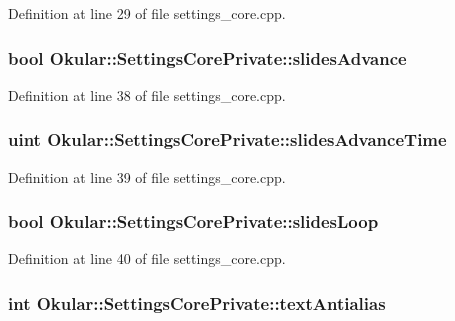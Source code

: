Definition at line 29 of file settings\+\_\+core.\+cpp.

\hypertarget{classOkular_1_1SettingsCorePrivate_a2f5216596525d18888fe9ca9f50a149e}{
\subsubsection[{slides\+Advance}]{\setlength{\rightskip}{0pt plus 5cm}bool Okular\+::\+Settings\+Core\+Private\+::slides\+Advance}}\label{classOkular_1_1SettingsCorePrivate_a2f5216596525d18888fe9ca9f50a149e}


Definition at line 38 of file settings\+\_\+core.\+cpp.

\hypertarget{classOkular_1_1SettingsCorePrivate_ab02e22e0548486391fa4394ba41e0a3e}{
\subsubsection[{slides\+Advance\+Time}]{\setlength{\rightskip}{0pt plus 5cm}uint Okular\+::\+Settings\+Core\+Private\+::slides\+Advance\+Time}}\label{classOkular_1_1SettingsCorePrivate_ab02e22e0548486391fa4394ba41e0a3e}


Definition at line 39 of file settings\+\_\+core.\+cpp.

\hypertarget{classOkular_1_1SettingsCorePrivate_a55785f695ad1a5457c9cda354f974b80}{
\subsubsection[{slides\+Loop}]{\setlength{\rightskip}{0pt plus 5cm}bool Okular\+::\+Settings\+Core\+Private\+::slides\+Loop}}\label{classOkular_1_1SettingsCorePrivate_a55785f695ad1a5457c9cda354f974b80}


Definition at line 40 of file settings\+\_\+core.\+cpp.

\hypertarget{classOkular_1_1SettingsCorePrivate_aabfb8b6638886cf90ebb5da026e64f50}{
\subsubsection[{text\+Antialias}]{\setlength{\rightskip}{0pt plus 5cm}int Okular\+::\+Settings\+Core\+Private\+::text\+Antialias}}\label{classOkular_1_1SettingsCorePrivate_aabfb8b6638886cf90ebb5da026e64f50}


